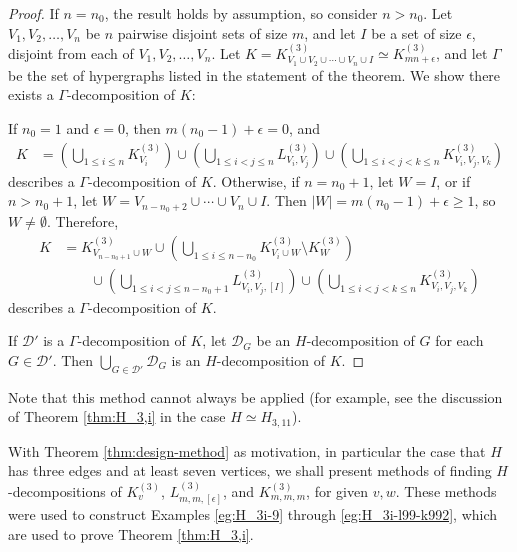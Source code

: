 \begin{proof}
If $n = n_0$, the result holds by assumption, so consider $n > n_0$.
Let $V_1, V_2, \ldots, V_n$ be $n$ pairwise disjoint sets of size $m$, and let $I$ be a set of size $\epsilon$, disjoint from each of $V_1, V_2, \ldots, V_n$.
Let $K = K_{V_1 \cup V_2 \cup \cdots \cup V_n \cup I}^{(3)} \simeq K_{mn + \epsilon}^{(3)}$, and let $\Gamma$ be the set of hypergraphs listed in the statement of the theorem. We show there exists a $\Gamma$-decomposition of $K$:

If $n_0 = 1$ and $\epsilon = 0$, then $m(n_0-1)+\epsilon = 0$, and
\begin{align*}
    K &= \left( \bigcup_{1 \leq i \leq n} K_{V_i}^{(3)} \right)
    \cup \left( \bigcup_{1 \leq i < j \leq n} L_{V_i,V_j}^{(3)} \right)
    \cup \left( \bigcup_{1 \leq i < j < k \leq n} K_{V_i,V_j,V_k}^{(3)} \right)
\end{align*}
describes a $\Gamma$-decomposition of $K$. Otherwise, if $n = n_0 + 1$, let $W = I$, or if $n > n_0 + 1$, let $W = V_{n-n_0+2} \cup \cdots \cup V_{n} \cup I$. Then $|W| = m(n_0-1)+\epsilon \geq 1$, so $W \neq \emptyset$. Therefore,
\begin{align*}
    K &= K_{V_{n-n_0+1} \cup W}^{(3)}
    \cup \left( \bigcup_{1 \leq i \leq n-n_0} K_{V_i \cup W}^{(3)} \setminus K_{W}^{(3)} \right)
    \\ & \quad \quad
    \cup \left( \bigcup_{1 \leq i < j \leq n-n_0+1} L_{V_i,V_j,[I]}^{(3)} \right)
    \cup \left( \bigcup_{1 \leq i < j < k \leq n} K_{V_i,V_j,V_k}^{(3)} \right)
\end{align*}
describes a $\Gamma$-decomposition of $K$.

If $\mathcal{D}'$ is a $\Gamma$-decomposition of $K$, let $\mathcal{D}_G$ be an $H$-decomposition of $G$ for each $G \in \mathcal{D}'$.
Then $\bigcup_{G \in \mathcal{D}'} \mathcal{D}_G$ is an $H$-decomposition of $K$.
\end{proof}

Note that this method cannot always be applied (for example, see the discussion of Theorem \ref{thm:H_3,i} in the case $H \simeq H_{3,11}$).

With Theorem \ref{thm:design-method} as motivation, in particular the case that $H$ has three edges and at least seven vertices, we shall present methods of finding $H$-decompositions of $K_{v}^{(3)}$, $L_{m,m,[\epsilon]}^{(3)}$, and $K_{m,m,m}^{(3)}$, for given $v, w$.
These methods were used to construct Examples \ref{eg:H_3i-9} through \ref{eg:H_3i-l99-k992}, which are used to prove Theorem \ref{thm:H_3,i}.

